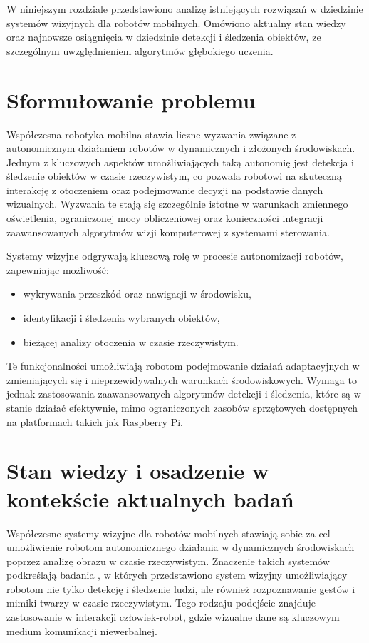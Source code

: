 \documentclass[a4paper,twoside,12pt]{book}
\begin{document}
\label{ch:analiza}

W niniejszym rozdziale przedstawiono analizę istniejących rozwiązań w dziedzinie systemów wizyjnych dla robotów mobilnych. Omówiono aktualny stan wiedzy oraz najnowsze osiągnięcia w dziedzinie detekcji i śledzenia obiektów, ze szczególnym uwzględnieniem algorytmów głębokiego uczenia.

\section{Sformułowanie problemu}
Współczesna robotyka mobilna stawia liczne wyzwania związane z autonomicznym działaniem robotów w dynamicznych i złożonych środowiskach. Jednym z kluczowych aspektów umożliwiających taką autonomię jest detekcja i śledzenie obiektów w czasie rzeczywistym, co pozwala robotowi na skuteczną interakcję z otoczeniem oraz podejmowanie decyzji na podstawie danych wizualnych. Wyzwania te stają się szczególnie istotne w warunkach zmiennego oświetlenia, ograniczonej mocy obliczeniowej oraz konieczności integracji zaawansowanych algorytmów wizji komputerowej z systemami sterowania.

Systemy wizyjne odgrywają kluczową rolę w procesie autonomizacji robotów, zapewniając możliwość:
\begin{itemize}
    \item wykrywania przeszkód oraz nawigacji w środowisku,
    \item identyfikacji i śledzenia wybranych obiektów,
    \item bieżącej analizy otoczenia w czasie rzeczywistym.
\end{itemize}

Te funkcjonalności umożliwiają robotom podejmowanie działań adaptacyjnych w zmieniających się i nieprzewidywalnych warunkach środowiskowych. Wymaga to jednak zastosowania zaawansowanych algorytmów detekcji i śledzenia, które są w stanie działać efektywnie, mimo ograniczonych zasobów sprzętowych dostępnych na platformach takich jak Raspberry Pi.

\newpage

\section{Stan wiedzy i osadzenie w kontekście aktualnych badań}
Współczesne systemy wizyjne dla robotów mobilnych stawiają sobie za cel umożliwienie robotom autonomicznego działania w dynamicznych środowiskach poprzez analizę obrazu w czasie rzeczywistym. Znaczenie takich systemów podkreślają badania \cite{bib:aoki2001realtime}, w których przedstawiono system wizyjny umożliwiający robotom nie tylko detekcję i śledzenie ludzi, ale również rozpoznawanie gestów i mimiki twarzy w czasie rzeczywistym. Tego rodzaju podejście znajduje zastosowanie w interakcji człowiek-robot, gdzie wizualne dane są kluczowym medium komunikacji niewerbalnej.
\end{document}
